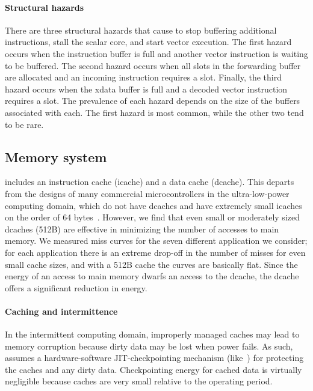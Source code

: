 \paragraph{Structural hazards}
There are three structural hazards that cause \manic to stop buffering additional
instructions, stall the scalar core, and start vector execution. 
%
The first hazard occurs when the instruction buffer is full and another vector instruction is waiting to be buffered.
%
The second hazard occurs when all slots in the forwarding buffer are allocated and an incoming instruction requires a slot.
%
Finally, the third hazard occurs when the xdata buffer is full and a decoded 
vector instruction requires a slot.
%
The prevalence of each hazard depends on the size of the buffers associated with each.
%
The first hazard is most common, while the other two tend to be rare.

\subsection{Memory system}
\label{manic:manic:memory}
\manic includes an instruction cache (icache) and a data cache (dcache).
%
This departs from the designs of many commercial microcontrollers 
in the ultra-low-power computing domain, which do
not have dcaches and have extremely small icaches on the order of 
64 bytes~\cite{msp430fr5994}.
%
However, we find that even small or moderately sized dcaches (512B) are effective in minimizing the number of accesses to main memory. 
%
We measured miss curves for the seven different application we consider; 
for each application there is an extreme drop-off in the number of misses for even 
small cache sizes,  and with a 512B cache the curves are basically flat.
%
Since the energy of an access to main memory dwarfs an access to the dcache,
the dcache offers a significant reduction in energy.

\paragraph{Caching and intermittence}
In the intermittent computing domain, improperly managed caches may
lead to memory corruption because dirty data may be lost when power fails.
%
As such, \manic assumes a hardware-software JIT-checkpointing mechanism
(like~\cite{hibernusplusplus, samoyed, quickrecall}) for protecting the caches
and any dirty data.
%
Checkpointing energy for cached data is virtually negligible because caches are
very small relative to the operating period. 
%

